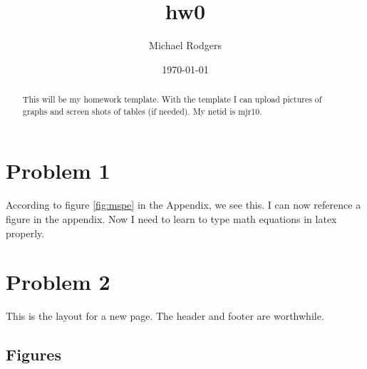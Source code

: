 \documentclass[a4paper]{article}
\title{hw0}
\author[1]{Michael Rodgers}
\affil[1]{Rice University}
\date{\today}
\begin{document}
\maketitle

\begin{abstract}
This will be my homework template. With the template I can upload pictures 
of graphs and screen shots of tables (if needed). My netid is mjr10.
\end{abstract}

\section{Problem 1}

According to figure \ref{fig:mspe} in the Appendix, we see this. I can now 
reference a figure in the appendix. Now I need to learn to type math 
equations in latex properly. 

\newpage

\section{Problem 2}

This is the layout for a new page. The header and footer are worthwhile.

\newpage

\begin{appendices}
\section{Figures}


\end{appendices}
\end{document}
